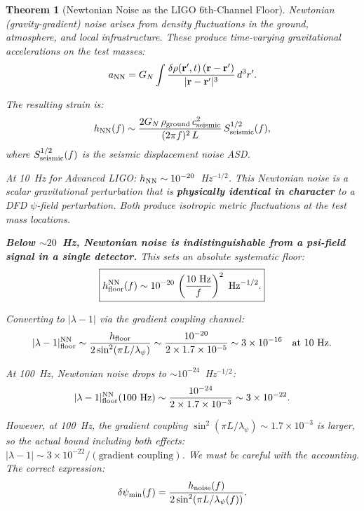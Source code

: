\documentclass[11pt]{article}
\newcommand{\lam}{\lambda}
\newcommand{\ee}[1]{\times 10^{#1}}
\newcommand{\lbone}{|\lam - 1|}
\newcommand{\GN}{G_N}
\newtheorem{theorem}{Theorem}[section]
\theoremstyle{definition}
\theoremstyle{remark}
\begin{document}
\begin{theorem}[Newtonian Noise as the LIGO 6th-Channel Floor]
\label{thm:newtonian_noise}
Newtonian (gravity-gradient) noise arises from density fluctuations
in the ground, atmosphere, and local infrastructure. These produce
time-varying gravitational accelerations on the test masses:
\begin{equation}
a_{\rm NN} = \GN \int \frac{\delta\rho(\mathbf{r}',t)\,
(\mathbf{r}-\mathbf{r}')}{|\mathbf{r}-\mathbf{r}'|^3}\,d^3r'.
\end{equation}

The resulting strain is:
\begin{equation}
h_{\rm NN}(f) \sim \frac{2\GN\,\rho_{\rm ground}\,c_{\rm seismic}^2}
{(2\pi f)^2\,L}\,S_{\rm seismic}^{1/2}(f),
\end{equation}
where $S_{\rm seismic}^{1/2}(f)$ is the seismic displacement noise ASD.

At 10~Hz for Advanced LIGO: $h_{\rm NN} \sim 10^{-20}$~Hz$^{-1/2}$.
This Newtonian noise is a \emph{scalar} gravitational perturbation
that is \textbf{physically identical in character} to a DFD
$\psi$-field perturbation. Both produce isotropic metric fluctuations
at the test mass locations.

\textbf{Below $\sim 20$~Hz, Newtonian noise is indistinguishable from
a psi-field signal in a single detector.} This sets an absolute
systematic floor:
\begin{equation}
\boxed{
h_{\rm floor}^{\rm NN}(f) \sim 10^{-20}\,\left(\frac{10~\text{Hz}}{f}
\right)^2~\text{Hz}^{-1/2}.
}
\end{equation}

Converting to $\lbone$ via the gradient coupling channel:
\begin{equation}
\lbone_{\rm floor}^{\rm NN} \sim \frac{h_{\rm floor}}{2\sin^2(\pi L/\lambda_\psi)}
\sim \frac{10^{-20}}{2\times 1.7\ee{-5}} \sim 3\ee{-16}
\quad\text{at 10~Hz.}
\end{equation}

At 100~Hz, Newtonian noise drops to $\sim 10^{-24}$~Hz$^{-1/2}$:
\begin{equation}
\lbone_{\rm floor}^{\rm NN}(100~\text{Hz}) \sim \frac{10^{-24}}{2\times 1.7\ee{-3}}
\sim 3\ee{-22}.
\end{equation}

However, at 100~Hz, the gradient coupling $\sin^2(\pi L/\lambda_\psi)
\sim 1.7\ee{-3}$ is larger, so the actual bound including both effects:
$\lbone \sim 3\ee{-22}/(\text{gradient coupling})$. We must be careful
with the accounting. The correct expression:
\begin{equation}
\delta\psi_{\rm min}(f) = \frac{h_{\rm noise}(f)}{2\sin^2(\pi L/\lambda_\psi(f))}.
\end{equation}


\end{theorem}
\end{document}
